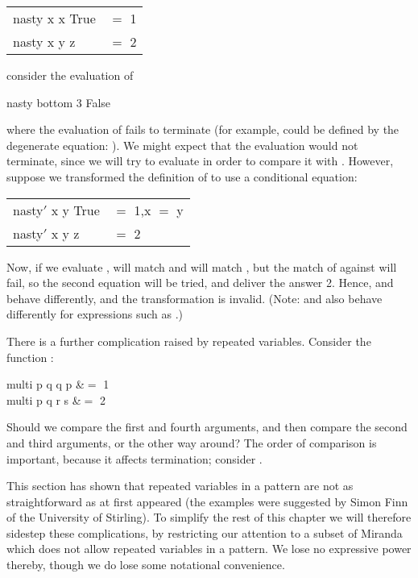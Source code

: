 \begin{mlcoded}
\begin{tabular}{ll}
    nasty x x True &$=$ 1\\
    nasty x y z &$=$ 2
\end{tabular}
\end{mlcoded}
consider the evaluation of
\begin{mlcoded}
    nasty bottom 3 False
\end{mlcoded}
where the evaluation of  fails to terminate (for example,  could be defined by the degenerate equation: ). We might expect that the evaluation  would not terminate, since we will try to evaluate  in order to compare it with . However, suppose we transformed the definition of  to use a conditional equation:
\begin{mlcoded}
\begin{tabular}{ll}
    nasty$'$ x y True &$=$ 1,\qquad x $=$ y\\
    nasty$'$ x y z &$=$ 2
\end{tabular}
\end{mlcoded}
Now, if we evaluate ,  will match  and  will match , but the match of  against  will fail, so the second equation will be tried, and deliver the answer 2. Hence,  and  behave differently, and the transformation is invalid. (Note:  and  also behave differently for expressions such as .)

There is a further complication raised by repeated variables. Consider the function :
\begin{letalign}
        multi p q q p &$=$ 1\\
    multi p q r s &$=$ 2
\end{letalign}

Should we compare the first and fourth arguments, and then compare the second and third arguments, or the other way around? The order of comparison is important, because it affects termination; consider .

This section has shown that repeated variables in a pattern are not as straightforward as at first appeared (the examples were suggested by Simon Finn of the University of Stirling). To simplify the rest of this chapter we will therefore sidestep these complications, by restricting our attention to a subset of Miranda which does not allow repeated variables in a pattern. We lose no expressive power thereby, though we do lose some notational convenience.

